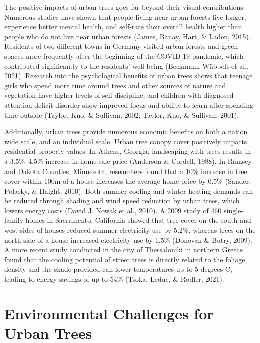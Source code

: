 \documentclass[12pt,twoside]{reedthesis}
\begin{document}
The positive impacts of urban trees goes far beyond their visual contributions. Numerous studies have shown that people living near urban forests live longer, experience better mental health, and self-rate their overall health higher than people who do not live near urban forests (James, Banay, Hart, \& Laden, 2015). Residents of two different towns in Germany visited urban forests and green spaces more frequently after the beginning of the COVID-19 pandemic, which contributed significantly to the residents' well-being (Beckmann-Wübbelt et al., 2021). Research into the psychological benefits of urban trees shows that teenage girls who spend more time around trees and other sources of nature and vegetation have higher levels of self-discipline, and children with diagnosed attention deficit disorder show improved focus and ability to learn after spending time outside (Taylor, Kuo, \& Sullivan, 2002; Taylor, Kuo, \& Sullivan, 2001).

Additionally, urban trees provide numerous economic benefits on both a nation wide scale, and an individual scale. Urban tree canopy cover positively impacts residential property values. In Athens, Georgia, landscaping with trees results in a 3.5\%--4.5\% increase in home sale price (Anderson \& Cordell, 1988). In Ramsey and Dakota Counties, Minnesota, researchers found that a 10\% increase in tree cover within 100m of a house increases the average home price by 0.5\% (Sander, Polasky, \& Haight, 2010). Both summer cooling and winter heating demands can be reduced through shading and wind speed reduction by urban trees, which lowers energy costs (David J. Nowak et al., 2010). A 2009 study of 460 single-family homes in Sacramento, California showed that tree cover on the south and west sides of houses reduced summer electricity use by 5.2\%, whereas trees on the north side of a house increased electricity use by 1.5\% (Donovan \& Butry, 2009). A more recent study conducted in the city of Thessaloniki in northern Greece found that the cooling potential of street trees is directly related to the foliage density and the shade provided can lower temperatures up to 5 degrees C, leading to energy savings of up to 54\% (Tsoka, Leduc, \& Rodler, 2021).

\hypertarget{environmental-challenges-for-urban-trees}{%
\section{Environmental Challenges for Urban Trees}\label{environmental-challenges-for-urban-trees}}
\end{document}
